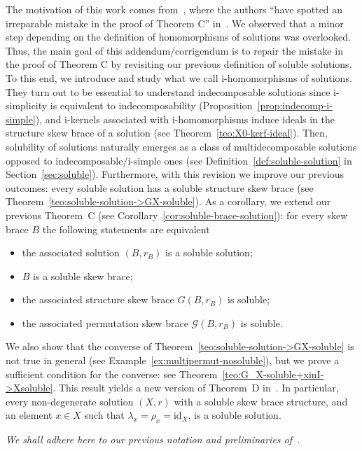 \documentclass[12pt, a4paper, english]{article}
\theoremstyle{definition}
\theoremstyle{remark}
\newcounter{cond}
\begin{document}
The motivation of this work comes from~\cite{FerraraTrombettiTsang25}, where the authors ``have spotted an irreparable mistake in the proof of Theorem C'' in~\cite{BallesterEstebanJimenezPerezC24-solubleskewbraces}. We observed that a minor step depending on the definition of homomorphisms of solutions was overlooked. Thus, the main goal of this addendum/corrigendum is to repair the mistake in the proof of Theorem C by revisiting our previous definition of soluble solutions. To this end, we introduce and study what we call i-homomorphisms of solutions. They turn out to be essential to understand indecomposable solutions since i-simplicity is equivalent to indecomposability (Proposition~\ref{prop:indecomp-i-simple}), and i-kernels associated with i-homomorphisms induce ideals in the structure skew brace of a solution (see Theorem~\ref{teo:X0-kerf-ideal}). Then, solubility of solutions naturally emerges as a class of multidecomposable solutions opposed to indecomposable/i-simple ones (see Definition~\ref{def:soluble-solution} in Section~\ref{sec:soluble}). Furthermore, with this revision we improve our previous outcomes: every soluble solution has a soluble structure skew brace (see Theorem~\ref{teo:soluble-solution->GX-soluble}). As a corollary, we extend our previous Theorem~C (see Corollary~\ref{cor:soluble-brace-solution}): for every skew brace $B$ the following statements are equivalent
\begin{itemize}
\item the associated solution $(B,r_B)$ is a soluble solution;
\item $B$ is a soluble skew brace;
\item the associated structure skew brace $G(B,r_B)$  is soluble;
\item the associated permutation skew brace $\mathcal{G}(B,r_B)$ is soluble.
\end{itemize}
We also show that the converse of Theorem~\ref{teo:soluble-solution->GX-soluble} is not true in general (see Example~\ref{ex:multipermut-nosoluble}), but we prove a sufficient condition for the converse: see Theorem~\ref{teo:G_X-soluble+xinI->Xsoluble}. This result yields a new version of Theorem~D in~\cite{BallesterEstebanJimenezPerezC24-solubleskewbraces}. In particular, every non-degenerate solution $(X,r)$ with a soluble skew brace structure, and an element $x\in X$ such that $\lambda_x = \rho_x = \mathrm{id}_X$, is a soluble solution.

\emph{We shall adhere here to our previous notation and preliminaries of~\cite{BallesterEstebanJimenezPerezC24-solubleskewbraces}.}
\end{document}
